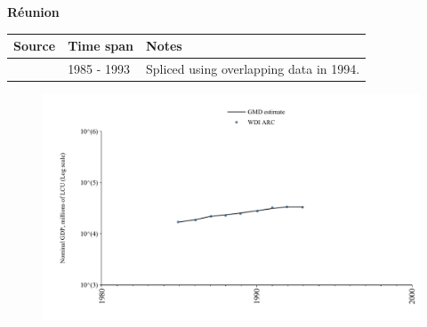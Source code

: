 \documentclass[12pt,a4paper,landscape]{article}
\begin{document}
\begin{adjustbox}{max totalsize={\paperwidth}{\paperheight},center}
\begin{minipage}[t][\textheight][t]{\textwidth}
\vspace*{0.5cm}
{}
\begin{center}
{\Large\bfseries Réunion}
\end{center}
\vspace{0.5cm}
\begin{table}[H]
\centering
\small
\begin{tabular}{|l|l|l|}
\hline
\textbf{Source} & \textbf{Time span} & \textbf{Notes} \\
\hline
\rowcolor{white}\cite{WDI_ARC}& 1985 - 1993 &Spliced using overlapping data in 1994.\\
\hline
\end{tabular}
\end{table}
\begin{figure}[H]
\centering
\includegraphics[width=\textwidth,height=0.6\textheight,keepaspectratio]{graphs/REU_nGDP.pdf}
\end{figure}
\end{minipage}
\end{adjustbox}
\end{document}
